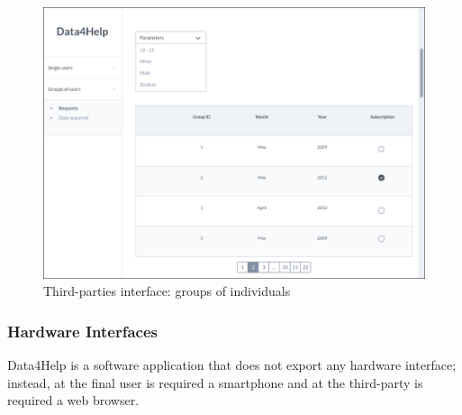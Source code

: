 \documentclass{article}
\begin{document}
	\begin{figure}[!h]
	 	\centering
		\includegraphics[width=\linewidth]{Figures/10Group}
		\caption{Third-parties interface: groups of individuals}
	\end{figure}\newpage
	
	\newpage
	\subsubsection{Hardware Interfaces}
	Data4Help is a software application that does not export any 
	hardware interface; instead, at the final user is required a 
	smartphone and at the third-party is required a web browser. 
			
\end{document}
